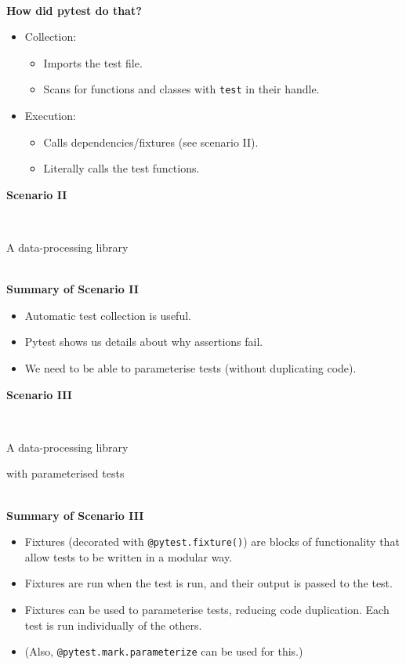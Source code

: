 \documentclass[12pt]{article}
\newlength{\geometrytop}
\newcommand{\slidetitle}[1]{~\\[-0.5ex]{\Large\bf{\color{bold}#1}}\\}
\begin{document}
\slidetitle{How did pytest do that?}
\begin{itemize}
\item Collection:
\begin{itemize}
\item Imports the test file.
\item Scans for functions and classes with \verb|test| in their handle.
\end{itemize}
\item Execution:
\begin{itemize}
\item Calls dependencies/fixtures (see scenario II).
\item Literally calls the test functions.
\end{itemize}
\end{itemize}
\clearpage

\thispagestyle{plain}
\vspace*{-\topskip}
\vspace*{\fill}
{\Huge\centerline{\textbf{Scenario II}}~\newline
\centerline{A data-processing library}}
\vspace*{\fill}
\vspace*{\geometrytop}
\clearpage

\slidetitle{Summary of Scenario II}
\begin{itemize}
\item Automatic test collection is useful.
\item Pytest shows us details about why assertions fail.
\item We need to be able to parameterise tests (without duplicating code).
\end{itemize}
\clearpage

\thispagestyle{plain}
\vspace*{-\topskip}
\vspace*{\fill}
{\Huge\centerline{\textbf{Scenario III}}~\newline
\centerline{A data-processing library}
\centerline{with parameterised tests}}
\vspace*{\fill}
\vspace*{\geometrytop}
\clearpage

\slidetitle{Summary of Scenario III}
\begin{itemize}
\item Fixtures (decorated with \verb|@pytest.fixture()|) are blocks of
    functionality that allow tests to be written in a modular way.
\item Fixtures are run when the test is run, and their output is passed to the
    test.
\item Fixtures can be used to parameterise tests, reducing code
    duplication. Each test is run individually of the others.
\item (Also, \verb|@pytest.mark.parameterize| can be used for this.)
\end{itemize}
\clearpage
\end{document}
